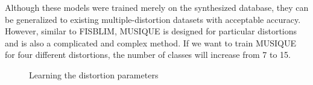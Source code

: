 Although these models were trained merely on the synthesized database, they can be generalized to existing multiple-distortion datasets with acceptable accuracy. However, similar to FISBLIM, MUSIQUE is designed for particular distortions and is also a complicated and complex method. If we want to train MUSIQUE for four different distortions, the number of classes will increase from 7 to 15. 
\begin{figure}
    \centering
    \caption{Learning the distortion parameters}
    \label{fig:dist_pam}
\end{figure}
